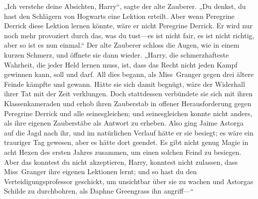 „Ich verstehe deine Absichten, Harry“, sagte der alte Zauberer. „Du denkst, du hast den Schlägern von Hogwarts eine Lektion erteilt. Aber wenn Peregrine Derrick diese Lektion lernen könnte, wäre er nicht Peregrine Derrick. Er wird nur noch mehr provoziert durch das, was du tust—es ist nicht fair, es ist nicht richtig, aber so ist es nun einmal.“ Der alte Zauberer schloss die Augen, wie in einem kurzen Schmerz, und öffnete sie dann wieder. „Harry, die schmerzhafteste Wahrheit, die jeder Held lernen muss, ist, dass das Recht nicht jeden Kampf gewinnen kann, soll und darf. All dies begann, als Miss~Granger gegen drei ältere Feinde kämpfte und gewann. Hätte sie sich damit begnügt, wäre der Widerhall ihrer Tat mit der Zeit verklungen. Doch stattdessen verbündete sie sich mit ihren Klassenkameraden und erhob ihren Zauberstab in offener Herausforderung gegen Peregrine Derrick und alle seinesgleichen; und seinesgleichen konnte nicht anders, als ihre eigenen Zauberstäbe als Antwort zu erheben. Also ging Jaime Astorga auf die Jagd nach ihr, und im natürlichen Verlauf hätte er sie besiegt; es wäre ein trauriger Tag gewesen, aber es hätte dort geendet. Es gibt nicht genug Magie in acht Hexen des ersten Jahres zusammen, um einen solchen Feind zu besiegen. Aber das konntest du nicht akzeptieren, Harry, konntest nicht zulassen, dass Miss~Granger ihre eigenen Lektionen lernt; und so hast du den Verteidigungsprofessor geschickt, um unsichtbar über sie zu wachen und Astorgas Schilde zu durchbohren, als Daphne Greengrass ihn angriff—“

